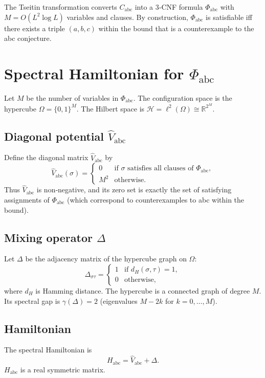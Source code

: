 \documentclass[11pt,a4paper]{article}
\begin{document}
The Tseitin transformation converts $C_{\text{abc}}$ into a 3‑CNF formula $\Phi_{\text{abc}}$ with $M = O(L^2 \log L)$ variables and clauses. By construction, $\Phi_{\text{abc}}$ is satisfiable iff there exists a triple $(a,b,c)$ within the bound that is a counterexample to the abc conjecture.

\section{Spectral Hamiltonian for $\Phi_{\text{abc}}$}

Let $M$ be the number of variables in $\Phi_{\text{abc}}$. The configuration space is the hypercube $\Omega = \{0,1\}^M$. The Hilbert space is $\mathcal{H} = \ell^2(\Omega) \cong \mathbb{R}^{2^M}$.

\subsection{Diagonal potential $\hat{V}_{\text{abc}}$}
Define the diagonal matrix $\hat{V}_{\text{abc}}$ by
\[
\hat{V}_{\text{abc}}(\sigma) = \begin{cases}
0 & \text{if }\sigma\text{ satisfies all clauses of } \Phi_{\text{abc}},\\
M^2 & \text{otherwise}.
\end{cases}
\]
Thus $\hat{V}_{\text{abc}}$ is non‑negative, and its zero set is exactly the set of satisfying assignments of $\Phi_{\text{abc}}$ (which correspond to counterexamples to abc within the bound).

\subsection{Mixing operator $\Delta$}
Let $\Delta$ be the adjacency matrix of the hypercube graph on $\Omega$:
\[
\Delta_{\sigma\tau} = \begin{cases}
1 & \text{if } d_H(\sigma,\tau)=1,\\
0 & \text{otherwise},
\end{cases}
\]
where $d_H$ is Hamming distance. The hypercube is a connected graph of degree $M$. Its spectral gap is $\gamma(\Delta)=2$ (eigenvalues $M-2k$ for $k=0,\dots,M$).

\subsection{Hamiltonian}
The spectral Hamiltonian is
\[
H_{\text{abc}} = \hat{V}_{\text{abc}} + \Delta.
\]
$H_{\text{abc}}$ is a real symmetric matrix.
\end{document}
